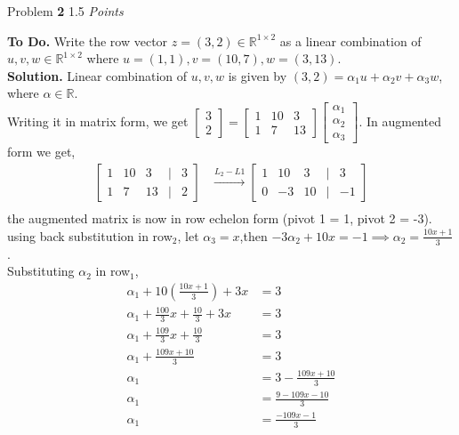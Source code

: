 \documentclass[11pt]{article}
\newcommand{\problem
}[2]{
\begin{mdframed}
    Problem \textbf{#1} \hfill #2
\end{mdframed}
}
\begin{document}
\problem{2}{1.5 \emph{Points}}
\textbf{To Do. } Write the row vector $z = (3, 2) \in \mathbb{R}^{1 \times 2}$ as a linear combination of $u, v, w \in \mathbb{R}^{1 \times 2}$ where $u = (1, 1), v = (10, 7), w = (3, 13)$.\\
\textbf{Solution. } Linear combination of $u, v, w$ is given by $(3, 2) = \alpha_{1} u + \alpha_{2} v + \alpha_{3} w$, where $\alpha \in \mathbb{R}$.\\
Writing it in matrix form, we get $\begin{bmatrix} 3 \\ 2 \end{bmatrix} = \begin{bmatrix} 1 & 10 & 3 \\ 1 & 7 & 13 \end{bmatrix} \begin{bmatrix} \alpha_{1} \\ \alpha_{2} \\ \alpha_{3} \end{bmatrix}$.
In augmented form we get,
\begin{align*}
	\begin{bmatrix} 1 & 10 & 3 & | & 3 \\ 1 & 7 & 13 & | & 2 \end{bmatrix} & \xrightarrow{L_2 - L1} \begin{bmatrix} 1 & 10 & 3 & | & 3 \\ 0 & -3 & 10 & | & -1 \end{bmatrix} \\
\end{align*}
the augmented matrix is now in row echelon form (pivot 1 = 1, pivot 2 = -3). using back substitution in row$_2$, let $\alpha_3 = x$,then $-3\alpha_{2} + 10x = -1 \implies \alpha_{2} = \frac{10x + 1}{3}$.\\
Substituting $\alpha_{2}$ in row$_1$,
\begin{align*}
	\alpha_{1} + 10\left(\frac{10x + 1}{3}\right) + 3x & = 3                       \\
	\alpha_{1} + \frac{100}{3}x + \frac{10}{3} + 3x    & = 3                       \\
	\alpha_{1} + \frac{109}{3}x + \frac{10}{3}         & = 3                       \\
	\alpha_{1} + \frac{109x + 10}{3}                   & = 3                       \\
	\alpha_{1}                                         & = 3 - \frac{109x + 10}{3} \\
	\alpha_{1}                                         & = \frac{9 - 109x - 10}{3} \\
	\alpha_1                                           & = \frac{-109x - 1}{3}
\end{align*}
\end{document}
